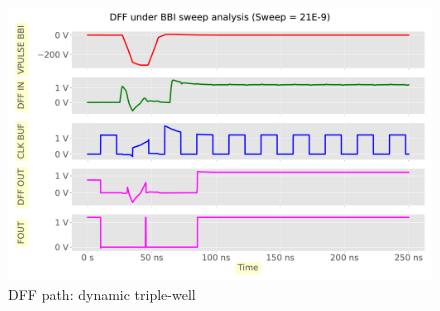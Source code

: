 
\begin{figure}[h]
	\centering
	\includegraphics[width=\columnwidth]{./figures/dff-pdf-tw-neg/anim0011.pdf}
	\caption{DFF path: dynamic triple-well}
	\label{dffdynamic-tw}
\end{figure}
